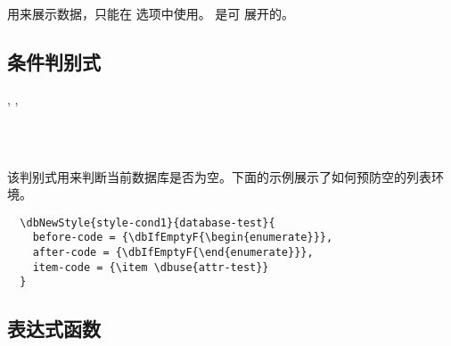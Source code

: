 \documentclass[full]{l3doc}
\begin{document}
\begin{documentation}
\begin{function}[added=2022-01-05, updated=2022-01-08, EXP]{\dbuse}
  \begin{syntax}
     
  \end{syntax}

   用来展示数据，只能在  选项中使用。 是可
  展开的。
\end{function}

\subsection{条件判别式}

\begin{function}[added=2022-01-05, EXP]{\dbIfEmptyT, \dbIfEmptyF, \dbIfEmptyTF}
  \begin{syntax}
       \\
      \\
     
  \end{syntax}

  该判别式用来判断当前数据库是否为空。下面的示例展示了如何预防空的列表环境。
\end{function}

\begin{verbatim}
  \dbNewStyle{style-cond1}{database-test}{
    before-code = {\dbIfEmptyF{\begin{enumerate}}},
    after-code = {\dbIfEmptyF{\end{enumerate}}},
    item-code = {\item \dbuse{attr-test}}
  }
\end{verbatim}


\subsection{表达式函数}


\end{documentation}
\end{document}
